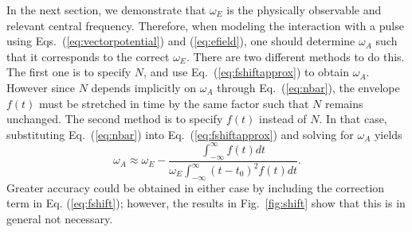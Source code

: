 In the next section, we demonstrate that $\omega_E$ is the physically observable and relevant central frequency. Therefore, when modeling the interaction with a pulse using Eqs.~(\ref{eq:vectorpotential}) and (\ref{eq:efield}), one should determine $\omega_A$  such that it corresponds to the correct $\omega_E$. There are two different methods to do this. The first one is to specify $N$, and use Eq.~(\ref{eq:fshiftapprox}) to obtain $\omega_A$. However since $N$ depends implicitly on $\omega_A$ through Eq.~(\ref{eq:nbar}), the envelope $f(t)$ must be stretched in time by the same factor such that $N$ remains unchanged. The second method is to specify $f(t)$ instead of $N$. In that case, substituting Eq.~(\ref{eq:nbar}) into Eq.~(\ref{eq:fshiftapprox}) and solving for $\omega_A$ yields
%
\begin{equation}
\label{eq:alternative}
\omega_A \approx \omega_E - \frac{\int_{-\infty}^{\infty} f(t) dt}{\omega_E\int_{-\infty}^{\infty} (t-t_0)^2 f(t) dt}.
\end{equation}
%
Greater accuracy could be obtained in either case by including the correction term in Eq. (\ref{eq:fshift}); however, the results in Fig.~\ref{fig:shift} show that this is in general not necessary. 

